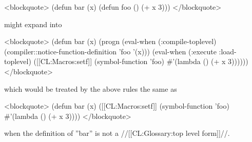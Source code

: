 <blockquote> (defun bar (x) (defun foo () (+ x 3))) </blockquote>

might expand into

<blockquote> (defun bar (x) (progn (eval-when (:compile-toplevel) (compiler::notice-function-definition 'foo '(x))) (eval-when (:execute :load-toplevel) ([[CL:Macros:setf]] (symbol-function 'foo) #'(lambda () (+ x 3)))))) </blockquote>

which would be treated by the above rules the same as

<blockquote> (defun bar (x) ([[CL:Macros:setf]] (symbol-function 'foo) #'(lambda () (+ x 3)))) </blockquote>

when the definition of ''bar'' is not a //[[CL:Glossary:top level form]]//. \endlist




    
